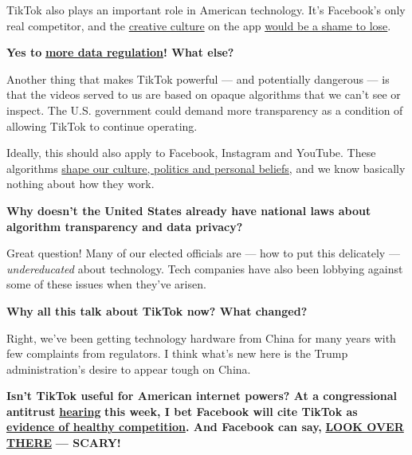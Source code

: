 TikTok also plays an important role in American technology. It's
Facebook's only real competitor, and the
\href{https://www.nytimes3xbfgragh.onion/2019/10/19/style/high-school-tiktok-clubs.html}{creative
culture} on the app
\href{https://www.nytimes3xbfgragh.onion/interactive/2019/10/10/arts/TIK-TOK.html}{would
be a shame to lose}.

\textbf{Yes to}
\textbf{\href{https://www.nytimes3xbfgragh.onion/2020/07/15/technology/just-collect-less-data-period.html}{more
data regulation}! What else?}

Another thing that makes TikTok powerful --- and potentially dangerous
--- is that the videos served to us are based on opaque algorithms that
we can't see or inspect. The U.S. government could demand more
transparency as a condition of allowing TikTok to continue operating.

Ideally, this should also apply to Facebook, Instagram and YouTube.
These algorithms
\href{https://www.nytimes3xbfgragh.onion/2020/04/16/technology/rabbit-hole-podcast-kevin-roose.html}{shape
our culture, politics and personal beliefs}, and we know basically
nothing about how they work.

\textbf{Why doesn't the United States already have national laws about
algorithm transparency and data privacy?}

Great question! Many of our elected officials are --- how to put this
delicately --- \emph{undereducated} about technology. Tech companies
have also been lobbying against some of these issues when they've
arisen.

\textbf{Why all this talk about TikTok now? What changed?}

Right, we've been getting technology hardware from China for many years
with few complaints from regulators. I think what's new here is the
Trump administration's desire to appear tough on China.

\textbf{Isn't TikTok useful for American internet powers? At a
congressional antitrust}
\textbf{\href{https://www.nytimes3xbfgragh.onion/2020/07/01/technology/amazon-apple-alphabet-facebook-congress-antitrust.html}{hearing}}
\textbf{this week, I bet Facebook will cite TikTok as}
\textbf{\href{https://www.bloomberg.com/news/articles/2020-07-27/zuckerberg-to-tell-congress-facebook-s-success-is-patriotic}{evidence
of healthy competition}. And Facebook can say,}
\textbf{\href{https://www.nytimes3xbfgragh.onion/2020/07/21/technology/us-china-technology.html}{LOOK
OVER THERE}} \textbf{--- SCARY!}

